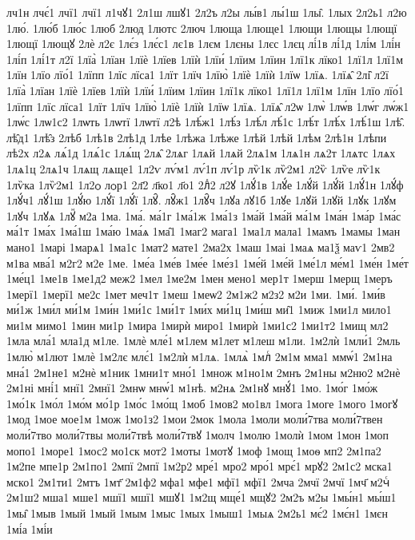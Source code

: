 {лч1н
лчє́1
лчї1
лчї1
л1чꙋ1
2л1ш
лшꙋ1
2л2ъ
л2ы
лы́в1
лы́1ш
1лы̑.
1лых
2л2ь1
л2ю
1лю́.
1лю́б
1лю́с
1люб
2люд
1лютс
2люч
1люща
1люще1
1лющи
1лющы
1лющї
1лющї
1лющꙋ
2лѐ
л2є
1лє́з
1лє́с1
лє1в
1лєм
1лєны
1лєс
1лєц
лі́1в
лі́1д
1лі́м
1лі́н
1лі́п
1лі́1т
л2ї
1лїа̀
1лїан
1лїѐ
1лїев
1лїѝ
1лїи́
1лїим
1лїин
1лї1к
лїко1
1лї1л
1лї1м
1лїн
1лїо
лїо́1
1лїпп
1лїс
лїса1
1лїт
1лїч
1лїю̀
1лїѐ
1лїѝ
1лїѡ
1лїѧ.
1лїѧ̑
2лі̑
л2ї
1лїа̀
1лїан
1лїѐ
1лїев
1лїѝ
1лїи́
1лїим
1лїин
1лї1к
лїко1
1лї1л
1лї1м
1лїн
1лїо
лїо́1
1лїпп
1лїс
лїса1
1лїт
1лїч
1лїю̀
1лїѐ
1лїѝ
1лїѡ
1лїѧ.
1лїѧ̑
л2ѡ
1лѡ̀
1лѡ́в
1лѡ́г
лѡ́ж1
1лѡ́с
1лѡ1с2
1лѡть
1лѡтї
1лѡтї
л2ѣ
1лѣ́ж1
1лѣ́з
1лѣ́л
лѣ́1с
1лѣ́т
1лѣ́х
1лѣ́1ш
1лѣ̑.
лѣ̑д1
1лѣ̑з
2лѣб
1лѣ1в
2лѣ1д
1лѣе
1лѣжа
1лѣже
1лѣй
1лѣй
1лѣм
2лѣ1н
1лѣпи
лѣ2х
л2ѧ
лѧ́1д
1лѧ́1с
1лѧ́щ
2лѧ̑
2лѧг
1лѧй
1лѧй
2лѧ1м
1лѧ1н
лѧ2т
1лѧтс
1лѧх
1лѧ1ц
2лѧ1ч
1лѧщ
лѧще1
1л2ѵ
лѵ́м1
лѵ́1п
лѵ́1р
лѷ1к
лѷ2м1
л2ѷ
1лѷе
лѷ1к
1лѷка
1лѷ2м1
1л2ѻ
лѻр1
2л҃2
л҃ко1
л҃о1
2лⷣ2
л2ꙋ
1лꙋ́1в
1лꙋ́е
1лꙋ́й
1лꙋ́й
1лꙋ́1н
1лꙋ́ф
1лꙋ́ч1
лꙋ́1ш
1лꙋ́ю
1лꙋ́ї
1лꙋ́ї
1лꙋ̑.
лꙋ̑ж1
1лꙋ̑ч
1лꙋа
лꙋ1б
1лꙋе
1лꙋй
1лꙋй
1лꙋк
1лꙋм
1лꙋч
1лꙋѧ
1лꙋⷩ
м2а
1ма.
1ма́.
ма́1г
1ма́1ж
1ма́1з
1ма́й
1ма́й
ма́1м
1ма́н
1ма́р
1ма́с
ма́1т
1ма́х
1ма́1ш
1ма́ю
1ма́ѧ
1ма̑1
1маг2
мага1
1ма1л
мала1
1мамъ
1мамы
1ман
мано1
1марі
1марѧ1
1ма1с
1мат2
мате1
2ма2х
1маш
1маі
1маѧ
ма1ѯ
маѵ1
2мв2
м1ва
мва́1
м2г2
м2е
1ме.
1ме́а
1ме́в
1ме́е
1ме́з1
1ме́й
1ме́й
1ме́1л
ме́м1
1ме́н
1ме́т
1ме́ц1
1ме1в
1ме1д2
меж2
1мел
1ме2м
1мен
мено1
мер1т
1мерш
1мерщ
1меръ
1мерї1
1мерї1
ме2с
1мет
меч1т
1меш
1меѡ2
2м1ж2
м2з2
м2и
1ми.
1ми́.
1ми́в
ми́1ж
1ми́л
ми́1м
1ми́н
1ми́1с
1ми́1т
1ми́х
ми́1ц
1ми́ш
ми̑1
1миж
1ми1л
мило1
ми1м
мимо1
1мин
ми1р
1мира
1мирѝ
миро1
1мирѝ
1ми1с2
1ми1т2
1мищ
мл2
1мла
мла́1
мла1д
м1ле.
1млѐ
мле́1
м1лем
м1лет
м1леш
м1ли.
1м2лѝ
1мли́1
2мль
1млю̀
м1лют
1млѐ
1м2лє
млє́1
1м2лѝ
м1лѧ.
1млѧ̀
1млⷭ
2м1м
мма1
ммѡ́1
2м1на
мна́1
2м1не1
м2нѐ
м1ник
1мни1т
мно́1
1множ
м1но1м
2мнъ
2м1ны
м2ню2
м2нѐ
2м1ні
мні́1
мнї1
2мнї1
2мнѡ
мнѡ́1
м1нѣ.
м2нѧ
2м1нꙋ
мнꙋ́1
1мо.
1мо́г
1мо́ж
1мо́1к
1мо́л
1мо́м
мо́1р
1мо́с
1мо́щ
1моб
1мов2
мо1вл
1мога
1моге
1мого
1могꙋ
1мод
1мое
мое1м
1мож
1мо1з2
1мои
2мок
1мола
1моли
моли́7тва
моли́7твен
моли́7тво
моли́7твы
моли́7твѣ
моли́7твꙋ
1молч
1молю
1молѝ
1мом
1мон
1моп
мопо1
1море1
1мос2
мо1ск
мот2
1моты
1мотꙋ
1моф
1мощ
1моѳ
мп2
2м1па2
1м2пе
мпе1р
2м1по1
2мпї
2мпї
1м2р2
мре́1
мро2
мро́1
мрє́1
мрꙋ2
2м1с2
мска1
мско1
2м1ти1
2мтъ
1мт҃
2м1ф2
мфа1
мфе1
мфї1
мфї1
2мча
2мчї
2мчї
1мч҃
м2чⷭ
2м1ш2
мша1
мше1
мшї1
мшї1
мшꙋ1
1м2щ
мще́1
мщꙋ2
2м2ъ
м2ы
1мы́н1
мы́ш1
1мы̑
1мыв
1мый
1мый
1мым
1мыс
1мых
1мыш1
1мыѧ
2м2ь1
мє́2
1мє́н1
1мєн
1мі́а
1мі́и
}
